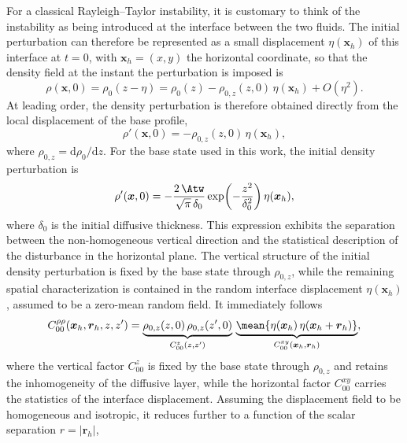 For a classical Rayleigh--Taylor instability, it is customary to think of the instability as being introduced at the interface between the two fluids. The initial perturbation can therefore be represented as a small displacement \(\eta(\boldsymbol{x}_h)\) of this interface at \(t=0\), with \(\boldsymbol{x}_h=(x,y)\) the horizontal coordinate, so that the density field at the instant the perturbation is imposed is
\begin{equation}
    \rho(\boldsymbol{x},0)
    =
    \rho_0(z-\eta)
    =
    \rho_0(z)
    -
    \rho_{0,z}(z,0)\,\eta(\boldsymbol{x}_h)
    +
    O\!\left(\eta^2\right).
    \label{eq:initial_density_displacement}
\end{equation}
At leading order, the density perturbation is therefore obtained directly from the local displacement of the base profile,
\begin{equation}
    \rho'(\boldsymbol{x},0)
    =
    -
    \rho_{0,z}(z,0)\,\eta(\boldsymbol{x}_h),
    \label{eq:initial_density_perturbation_eta}
\end{equation}
where \(\rho_{0,z}=\mathrm{d}\rho_0/\mathrm{d}z\). For the base state used in this work, the initial density perturbation is
\begin{equation}
    \rho'(\boldsymbol{x},0)
    =
    -
    \frac{2\,\Atw}{\sqrt{\pi}\,\delta_0}
    \exp\!\left(-\frac{z^2}{\delta_0^2}\right)
    \eta(\boldsymbol{x}_h),
    \label{eq:initial_density_perturbation_erf}
\end{equation}
where \(\delta_0\) is the initial diffusive thickness. This expression exhibits the separation between the non-homogeneous vertical direction and the statistical description of the disturbance in the horizontal plane. The vertical structure of the initial density perturbation is fixed by the base state through \(\rho_{0,z}\), while the remaining spatial characterization is contained in the random interface displacement \(\eta(\boldsymbol{x}_h)\), assumed to be a zero-mean random field. It immediately follows
\begin{equation}
    C_{00}^{\rho\rho}(\boldsymbol{x}_h,\boldsymbol{r}_h,z,z')
    =
    \underbrace{\rho_{0,z}(z,0)\,\rho_{0,z}(z',0)}_{C_{00}^{z}(z,z')}\,
    \underbrace{\mean{\eta(\boldsymbol{x}_h)\,\eta(\boldsymbol{x}_h+\boldsymbol{r}_h)}}_{C_{00}^{xy}(\boldsymbol{x}_h,\boldsymbol{r}_h)},
    \label{eq:initial_density_covariance_separable}
\end{equation}
where the vertical factor \(C_{00}^{z}\) is fixed by the base state through \(\rho_{0,z}\) and retains the inhomogeneity of the diffusive layer, while the horizontal factor \(C_{00}^{xy}\) carries the statistics of the interface displacement. Assuming the displacement field to be homogeneous and isotropic, it reduces further to a function of the scalar separation \(r=|\boldsymbol{r}_h|\),
